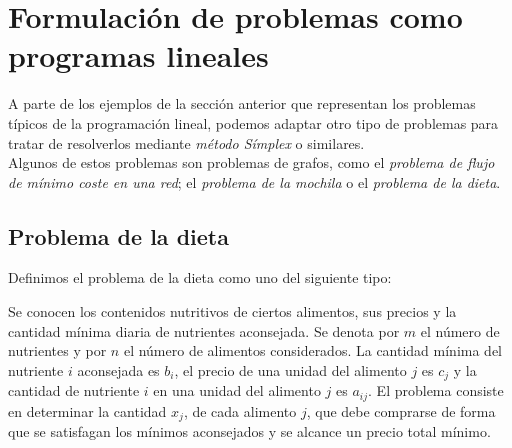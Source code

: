 \section{Formulación de problemas como programas lineales}

A parte de los ejemplos de la sección anterior que representan los problemas típicos de la programación lineal, podemos adaptar otro tipo de problemas para tratar de resolverlos mediante \textit{método Símplex} o similares.\\

Algunos de estos problemas son problemas de grafos, como el \textit{problema de flujo de mínimo coste en una red}; el \textit{problema de la mochila} o el \textit{problema de la dieta}.

\subsection{Problema de la dieta}
\begin{defi} Definimos el problema de la dieta como uno del siguiente tipo:

Se conocen los contenidos nutritivos de ciertos alimentos, sus precios y la cantidad mínima diaria de nutrientes aconsejada. Se denota por $m$ el número de nutrientes y por $n$ el número de alimentos considerados. La cantidad mínima del nutriente $i$ aconsejada es $b_i$, el precio de una unidad del alimento $j$ es $c_j$ y la cantidad de nutriente $i$ en una unidad del alimento $j$ es $a_{ij}$. El problema consiste en determinar la cantidad $x_j$, de cada alimento $j$, que debe comprarse de forma que se satisfagan los mínimos aconsejados y se alcance un precio total mínimo.
\end{defi}

